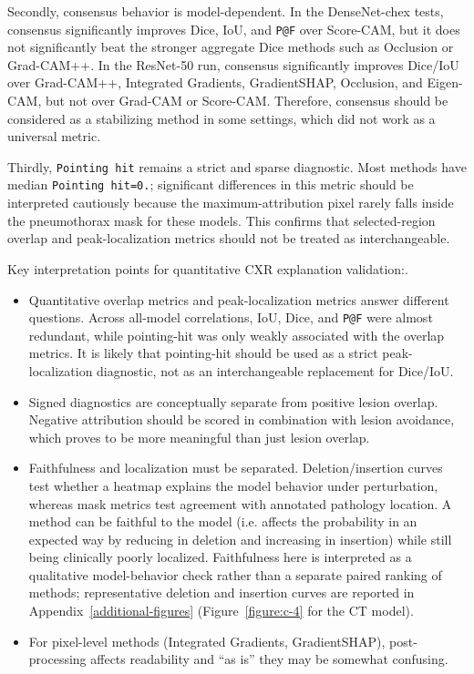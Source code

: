 Secondly, consensus behavior is model-dependent. In the DenseNet-chex
tests,
consensus significantly improves Dice, IoU, and \texttt{P@F}
over Score-CAM, but it does not significantly beat the
stronger aggregate Dice methods such as Occlusion or
Grad-CAM++. In the ResNet-50 run, consensus
significantly improves Dice/IoU over Grad-CAM++,
Integrated Gradients, GradientSHAP,
Occlusion, and Eigen-CAM, but not over
Grad-CAM or Score-CAM. Therefore, consensus should
be considered as a stabilizing method in some settings, which did not work as a universal
metric.

Thirdly, \texttt{Pointing \allowbreak hit} remains a strict and sparse diagnostic.
Most methods have median \texttt{Pointing \allowbreak hit=0.}; significant
differences in this metric should be interpreted cautiously because the
maximum-attribution pixel rarely falls inside the pneumothorax mask for these models.
This confirms that selected-region overlap
and peak-localization metrics should not be treated as interchangeable.

Key interpretation points for quantitative CXR explanation validation:.
\begin{itemize}
\item
Quantitative overlap metrics and peak-localization metrics answer
different questions. Across all-model correlations,
IoU, Dice, and \texttt{P@F} were almost redundant, while
pointing-hit was only weakly associated with the overlap metrics.
It is likely that  
pointing-hit should be used as a strict peak-localization diagnostic, not as an
interchangeable replacement for Dice/IoU.
\item Signed diagnostics are
conceptually separate from positive lesion overlap. Negative attribution
should be scored in combination with lesion avoidance, which proves to be more
meaningful than just lesion overlap.
\item Faithfulness and localization must be
separated. Deletion/insertion curves test whether a
heatmap explains the model behavior under perturbation, whereas mask
metrics test agreement with annotated pathology location. A method can
be faithful to the model (i.e. affects the probability in an expected way by reducing in
deletion and increasing in insertion) while still being clinically poorly localized.
Faithfulness here is interpreted as a qualitative model-behavior check rather than a
separate paired ranking of methods; representative deletion and insertion curves are
reported in Appendix~\ref{additional-figures} (Figure~\ref{figure:c-4} for the CT model).
\item For
pixel-level methods (Integrated Gradients,
GradientSHAP), post-processing affects readability and 
``as is'' they may be somewhat confusing. 
\end{itemize}


